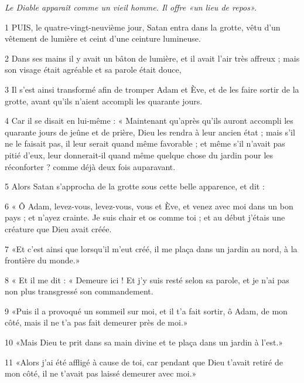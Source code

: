 
\par \textit{Le Diable apparaît comme un vieil homme. Il offre «un lieu de repos».}

\par 1 PUIS, le quatre-vingt-neuvième jour, Satan entra dans la grotte, vêtu d'un vêtement de lumière et ceint d'une ceinture lumineuse.

\par 2 Dans ses mains il y avait un bâton de lumière, et il avait l'air très affreux ; mais son visage était agréable et sa parole était douce,

\par 3 Il s'est ainsi transformé afin de tromper Adam et Ève, et de les faire sortir de la grotte, avant qu'ils n'aient accompli les quarante jours.

\par 4 Car il se disait en lui-même : « Maintenant qu'après qu'ils auront accompli les quarante jours de jeûne et de prière, Dieu les rendra à leur ancien état ; mais s’il ne le faisait pas, il leur serait quand même favorable ; et même s'il n'avait pas pitié d'eux, leur donnerait-il quand même quelque chose du jardin pour les réconforter ? comme déjà deux fois auparavant.

\par 5 Alors Satan s'approcha de la grotte sous cette belle apparence, et dit :

\par 6 « Ô Adam, levez-vous, levez-vous, vous et Ève, et venez avec moi dans un bon pays ; et n'ayez crainte. Je suis chair et os comme toi ; et au début j’étais une créature que Dieu avait créée.

\par 7 «Et c'est ainsi que lorsqu'il m'eut créé, il me plaça dans un jardin au nord, à la frontière du monde.»

\par 8 « Et il me dit : « Demeure ici ! Et j’y suis resté selon sa parole, et je n’ai pas non plus transgressé son commandement.

\par 9 «Puis il a provoqué un sommeil sur moi, et il t'a fait sortir, ô Adam, de mon côté, mais il ne t'a pas fait demeurer près de moi.»

\par 10 «Mais Dieu te prit dans sa main divine et te plaça dans un jardin à l'est.»

\par 11 «Alors j'ai été affligé à cause de toi, car pendant que Dieu t'avait retiré de mon côté, il ne t'avait pas laissé demeurer avec moi.»

